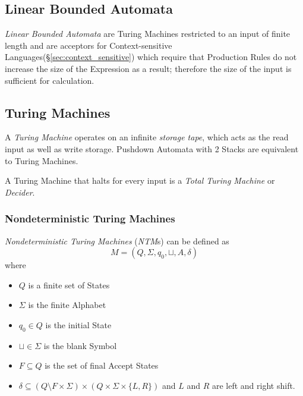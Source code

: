 \subsection{Linear Bounded Automata} \label{sec:linear_bounded_automata}

\emph{Linear Bounded Automata} are Turing Machines restricted to an
input of finite length and are acceptors for Context-sensitive
Languages(\S\ref{sec:context_sensitive}) which require that
Production Rules do not increase the size of the Expression as a
result; therefore the size of the input is sufficient for calculation.



\subsection{Turing Machines}\label{sec:turing_machine}

A \emph{Turing Machine} operates on an infinite \emph{storage tape},
which acts as the read input as well as write storage. Pushdown
Automata with 2 Stacks are equivalent to Turing Machines.

A Turing Machine that halts for every input is a \emph{Total Turing
  Machine} or \emph{Decider}.



\subsubsection{Nondeterministic Turing Machines}

\emph{Nondeterministic Turing Machines} (\emph{NTM}s) can be defined
as
    \[
        M = (Q, \Sigma, q_0, \sqcup, A, \delta)
    \]
where
\begin{itemize}
\item $Q$ is a finite set of States
\item $\Sigma$ is the finite Alphabet
\item $q_0 \in Q$ is the initial State
\item $\sqcup \in \Sigma$ is the blank Symbol
\item $F \subseteq Q$ is the set of final Accept States
\item $\delta \subseteq (Q \setminus F \times \Sigma) \times (Q \times
  \Sigma \times \{L,R\})$ and $L$ and $R$ are left and right shift.
\end{itemize}

